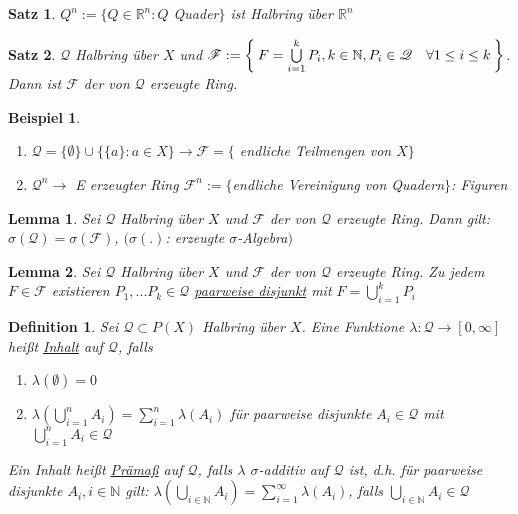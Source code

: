 \documentclass[11pt]{memoir}
\theoremstyle{changebreak}
\newtheorem{Definition}{Definition}[chapter]
\newtheorem{Beispiel}{Beispiel}[chapter]
\newtheorem{Lemma}{Lemma}[chapter]
\newtheorem{Satz}{Satz}[chapter]
\begin{document}
\begin{Satz}
$Q^n := \{Q \in \mathbb R^n: Q $ Quader$\}$ ist Halbring über $\mathbb R^n$
\end{Satz}

\begin{Satz}
$\mathscr Q$ Halbring über $X$ und $\mathscr F := \Set{F = \bigcup\limits_{i=1}^k P_i, k \in \mathbb N, P_i \in \mathscr Q \quad \forall 1 \leq i \leq k}$. Dann ist $\mathscr F$ der von $\mathscr Q$ erzeugte Ring.
\end{Satz}

\begin{Beispiel}
\begin{enumerate}
	\item $\mathscr Q = \{\emptyset \} \cup \{\{a\}: a \in X\} \rightarrow \mathscr F = \{$ endliche Teilmengen von $X\}$
	\item $\mathscr Q^n \rightarrow$ E erzeugter Ring $\mathscr F^n:= \{$endliche Vereinigung von Quadern$\}$: Figuren
\end{enumerate}
\end{Beispiel}

\begin{Lemma}
Sei $\mathscr Q$ Halbring über $X$ und $\mathscr F$ der von $\mathscr Q$ erzeugte Ring. Dann gilt: $\sigma(\mathscr Q) = \sigma(\mathscr F)$, $(\sigma(.)$: erzeugte $\sigma$-Algebra$)$
\end{Lemma}

\begin{Lemma}
Sei $\mathscr Q$ Halbring über $X$ und $\mathscr F$ der von $\mathscr Q$ erzeugte Ring. Zu jedem $F \in \mathscr F$ existieren $P_1, ... P_k \in \mathscr Q$ \underline{paarweise disjunkt} mit $F = \bigcup\limits_{i=1}^k P_i$
\end{Lemma}

\begin{Definition}
Sei $\mathscr Q \subset P(X)$ Halbring über $X$. Eine Funktione $\lambda: \mathscr Q \rightarrow [0, \infty ]$ heißt \underline{Inhalt} auf $\mathscr Q$, falls
\begin{enumerate}
	\item $\lambda(\emptyset) = 0$
	\item $\lambda\left(\bigcup\limits_{i=1}^n	A_i\right) = \sum\limits_{i=1}^n \lambda(A_i)$ für paarweise disjunkte $A_i \in \mathscr Q$ mit $\bigcup\limits_{i=1}^n A_i \in \mathscr Q$
\end{enumerate}
Ein Inhalt heißt \underline{Prämaß} auf $\mathscr Q$, falls $\lambda$ $\sigma$-additiv auf $\mathscr Q$ ist, d.h. für paarweise disjunkte $A_i, i \in \mathbb N$ gilt: $\lambda\left(\bigcup\limits_{i\in \mathbb N} A_i \right) = \sum\limits_{i=1}^\infty \lambda(A_i)$, falls $\bigcup\limits_{i \in \mathbb N} A_i \in \mathscr Q$
\end{Definition}
\end{document}
